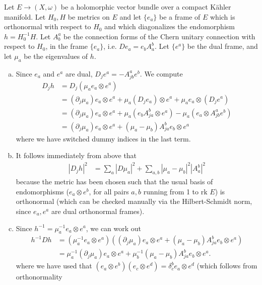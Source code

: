 \documentclass{../mathnotes}
\begin{document}
Let $E\to (X,\omega)$ be a holomorphic vector bundle over a compact K\"ahler manifold. Let $H_0, H$ be
metrics on $E$ and let $\{e_a\}$ be a frame of $E$ which is orthonormal with respect to $H_0$ and
which diagonalizes the endomorphism $h=H_0^{-1}H$. Let $A^a_b$ be the connection forms of the Chern
unitary connection with respect to $H_0$, in the frame $\{e_a\}$, i.e. $De_a=e_bA^b_a$. Let $\{e^a\}$
be the dual frame, and let $\mu_a$ be the eigenvalues of $h$.
\begin{enumerate}[(a)]
    \item Since $e_a$ and $e^a$ are dual, $D_je^a=-A^a_{jb}e^b$.
        We compute
        \begin{align*}
            D_jh &= D_j(\mu_ae_a\otimes e^a)\\
            &= (\partial_j\mu_a)e_a\otimes e^a + \mu_a(D_je_a)\otimes e^a+\mu_a e_a\otimes (D_je^a)\\
            &= (\partial_j\mu_a)e_a\otimes e^a+\mu_a(e_bA^b_{ja}\otimes e^a)-\mu_a(e_a\otimes A^a_{jb}e^b)\\
            &= (\partial_j\mu_a)e_a\otimes e^a+(\mu_a-\mu_b)A^b_{ja}e_b\otimes e^a
        \end{align*}
        where we have switched dummy indices in the last term.
    \item It follows immediately from above that
        \begin{align*}
            |D_jh|^2 &= \sum_a |D\mu_a|^2 + \sum_{a,b}|\mu_a-\mu_b|^2|A^b_a|^2
        \end{align*}
        because the metric has been chosen such that the usual basis of endomorphisms ($e_a\otimes e^b$, for all
        pairs $a,b$ running from 1 to $\text{rk }E$) is orthonormal (which can be checked manually via the Hilbert-Schmidt
        norm, since $e_a,e^a$ are dual orthonormal frames).
    \item Since $h^{-1}=\mu_a^{-1}e_a\otimes e^a$, we can work out
        \begin{align*}
            h^{-1}Dh&=(\mu_a^{-1}e_a\otimes e^a)\left( (\partial_j\mu_a)e_a\otimes e^a+(\mu_a-\mu_b)A^b_{ja}e_b\otimes e^a \right)\\
            &=\mu_a^{-1}(\partial_j\mu_a)e_a\otimes e^a+\mu_b^{-1}(\mu_a-\mu_b)A^{b}_{ja}e_b\otimes e^a.
        \end{align*}
        where we have used that $(e_a\otimes e^b)(e_c\otimes e^d)=\delta_c^be_a\otimes e^d$ (which follows from orthonormality

\end{enumerate}
\end{document}
